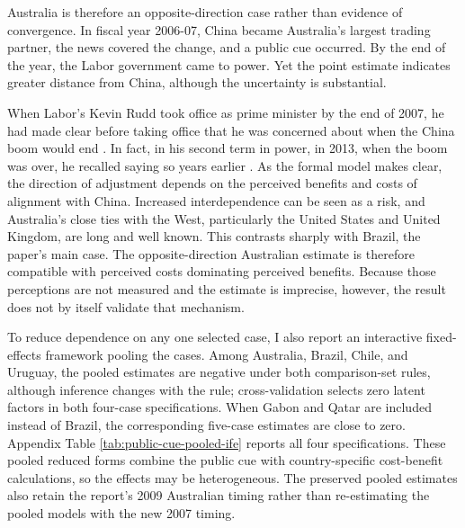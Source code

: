 \documentclass[referee,pdflatex,sn-basic]{sn-jnl}
\theoremstyle{thmstylethree}
\begin{document}
Australia is therefore an opposite-direction case rather than evidence of convergence. In fiscal year 2006-07, China became Australia's largest trading partner, the news covered the change, and a public cue occurred. By the end of the year, the Labor government came to power. Yet the point estimate indicates greater distance from China, although the uncertainty is substantial.

When Labor's Kevin Rudd took office as prime minister by the end of 2007, he had made clear before taking office that he was concerned about when the China boom would end \citep{uhlmann2007rudd}. In fact, in his second term in power, in 2013, when the boom was over, he recalled saying so years earlier \citep{rudd2013economy}. As the formal model makes clear, the direction of adjustment depends on the perceived benefits and costs of alignment with China. Increased interdependence can be seen as a risk, and Australia's close ties with the West, particularly the United States and United Kingdom, are long and well known. This contrasts sharply with Brazil, the paper's main case. The opposite-direction Australian estimate is therefore compatible with perceived costs dominating perceived benefits. Because those perceptions are not measured and the estimate is imprecise, however, the result does not by itself validate that mechanism.

To reduce dependence on any one selected case, I also report an interactive fixed-effects framework pooling the cases. Among Australia, Brazil, Chile, and Uruguay, the pooled estimates are negative under both comparison-set rules, although inference changes with the rule; cross-validation selects zero latent factors in both four-case specifications. When Gabon and Qatar are included instead of Brazil, the corresponding five-case estimates are close to zero. Appendix Table \ref{tab:public-cue-pooled-ife} reports all four specifications. These pooled reduced forms combine the public cue with country-specific cost-benefit calculations, so the effects may be heterogeneous. The preserved pooled estimates also retain the report's 2009 Australian timing rather than re-estimating the pooled models with the new 2007 timing.
\end{document}

